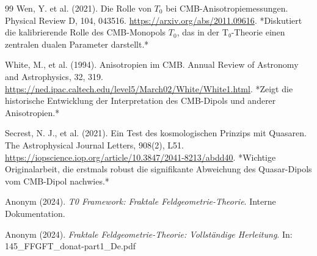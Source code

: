 \begin{thebibliography}{99}
	Wen, Y. et al. (2021). Die Rolle von \(T_0\) bei CMB-Anisotropiemessungen. 
	Physical Review D, 104, 043516.
	\href{https://arxiv.org/abs/2011.09616}{https://arxiv.org/abs/2011.09616}.
	*Diskutiert die kalibrierende Rolle des CMB-Monopols \(T_0\), das in der T₀-Theorie einen zentralen dualen Parameter darstellt.*
	
	White, M., et al. (1994). Anisotropien im CMB. 
	Annual Review of Astronomy and Astrophysics, 32, 319.
	\href{https://ned.ipac.caltech.edu/level5/March02/White/White1.html}{https://ned.ipac.caltech.edu/level5/March02/White/White1.html}.
	*Zeigt die historische Entwicklung der Interpretation des CMB-Dipols und anderer Anisotropien.*
	
	Secrest, N. J., et al. (2021). Ein Test des kosmologischen Prinzips mit Quasaren. 
	The Astrophysical Journal Letters, 908(2), L51.
	\href{https://iopscience.iop.org/article/10.3847/2041-8213/abdd40}{https://iopscience.iop.org/article/10.3847/2041-8213/abdd40}.
	*Wichtige Originalarbeit, die erstmals robust die signifikante Abweichung des Quasar-Dipols vom CMB-Dipol nachwies.*
	
	Anonym (2024). \textit{T0 Framework: Fraktale Feldgeometrie-Theorie}. 
	Interne Dokumentation.
	
	Anonym (2024). \textit{Fraktale Feldgeometrie-Theorie: Vollständige Herleitung}. 
	In: 145\_FFGFT\_donat-part1\_De.pdf
	
\end{thebibliography}